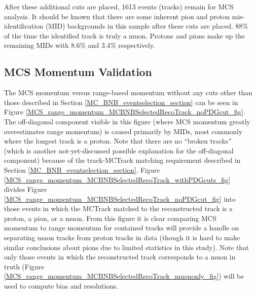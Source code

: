 After these additional cuts are placed, 1613 events (tracks) remain for MCS analysis. It should be known that there are some inherent pion and proton mis-identification (MID) backgrounds in this sample after these cuts are placed. 88\% of the time the identified track is truly a muon. Protons and pions make up the remaining MIDs with 8.6\% and 3.4\% respectively.




\subsection{MCS Momentum Validation}\label{MCS_Momentum_Validation_MCBNBSelectedRecoTrack_section}
The MCS momentum versus range-based momentum without any cuts other than those described in Section \ref{MC_BNB_eventselection_section} can be seen in Figure \ref{MCS_range_momentum_MCBNBSelectedRecoTrack_noPDGcut_fig}. The off-diagonal component visible in this figure (where MCS momentum greatly overestimates range momentum) is caused primarily by MIDs, most commonly where the longest track is a proton. Note that there are no ``broken tracks'' (which is another not-yet-discussed possible explanation for the off-diagonal component) because of the track-{\sc MCTrack} matching requirement described in Section \ref{MC_BNB_eventselection_section}. Figure \ref{MCS_range_momentum_MCBNBSelectedRecoTrack_withPDGcuts_fig} divides Figure \ref{MCS_range_momentum_MCBNBSelectedRecoTrack_noPDGcut_fig} into those events in which the MCTrack matched to the reconstructed track is a proton, a pion, or a muon. From this figure it is clear comparing MCS momentum to range momentum for contained tracks will provide a handle on separating muon tracks from proton tracks in data (though it is hard to make similar conclusions about pions due to limited statistics in this study). Note that only those events in which the reconstructed track corresponds to a muon in truth (Figure \ref{MCS_range_momentum_MCBNBSelectedRecoTrack_muononly_fig}) will be used to compute bias and resolutions.\\

